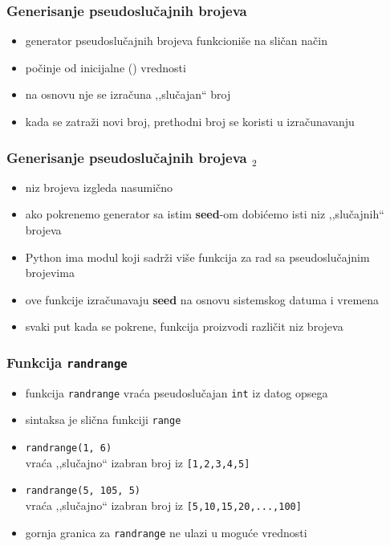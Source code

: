 \documentclass[utf8,compress,aspectratio=169]{beamer}
\begin{document}
\begin{frame}
  \frametitle{Generisanje pseudoslučajnih brojeva}
  \begin{itemize}
    \item generator pseudoslučajnih brojeva funkcioniše na sličan način
    \item počinje od inicijalne () vrednosti
    \item na osnovu nje se izračuna ,,slučajan`` broj
    \item kada se zatraži novi broj, prethodni broj se koristi u izračunavanju
  \end{itemize}
\end{frame}

\begin{frame}
  \frametitle{Generisanje pseudoslučajnih brojeva $_2$}
  \begin{itemize}
    \item niz brojeva izgleda nasumično
    \item ako pokrenemo generator sa istim \textbf{seed}-om dobićemo isti niz ,,slučajnih`` brojeva
    \item Python ima modul koji sadrži više funkcija za rad sa pseudoslučajnim brojevima
    \item ove funkcije izračunavaju \textbf{seed} na osnovu sistemskog datuma i vremena
    \item svaki put kada se pokrene, funkcija proizvodi različit niz brojeva
  \end{itemize}
\end{frame}

\begin{frame}
  \frametitle{Funkcija \texttt{randrange}}
  \begin{itemize}
    \item funkcija \texttt{randrange} vraća pseudoslučajan \texttt{int} iz datog opsega
    \item sintaksa je slična funkciji \texttt{range}
    \item \texttt{randrange(1, 6)} \\
      vraća ,,slučajno`` izabran broj iz \texttt{[1,2,3,4,5]}
    \item \texttt{randrange(5, 105, 5)} \\
      vraća ,,slučajno`` izabran broj iz \texttt{[5,10,15,20,...,100]}
    \item gornja granica za \texttt{randrange} ne ulazi u moguće vrednosti
  \end{itemize}
\end{frame}
\end{document}
